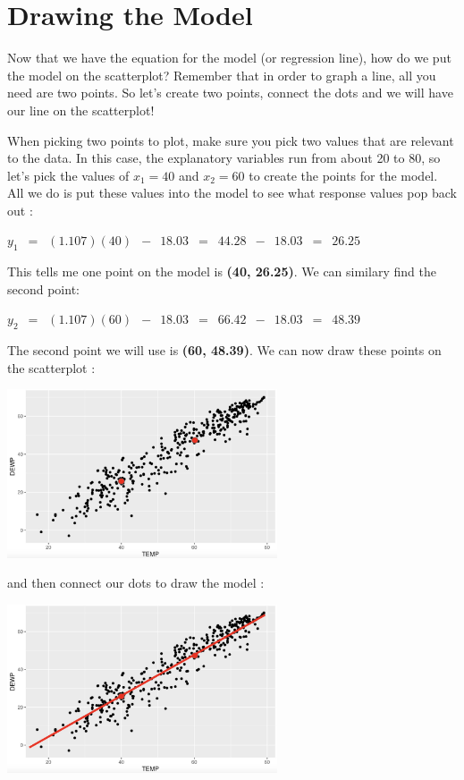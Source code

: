 \documentclass[
  letterpaper,
  DIV=11,
  numbers=noendperiod]{scrreprt}
\begin{document}
\section*{Drawing the Model}\label{drawing-the-model}


Now that we have the equation for the model (or regression line), how do
we put the model on the scatterplot? Remember that in order to graph a
line, all you need are two points. So let's create two points, connect
the dots and we will have our line on the scatterplot!

When picking two points to plot, make sure you pick two values that are
relevant to the data. In this case, the explanatory variables run from
about 20 to 80, so let's pick the values of \(x_1 = 40\) and
\(x_2 = 60\) to create the points for the model. All we do is put these
values into the model to see what response values pop back out :

\(\displaystyle{y_1 \,\,\, = \,\,\,(1.107)(40)\,\,\, -\,\,\, 18.03\,\,\,
= \,\,\, 44.28 \,\,\,-\,\,\,18.03\,\,\,=\,\,\,26.25}\)

This tells me one point on the model is \textbf{(40, 26.25)}. We can
similary find the second point:

\(\displaystyle{y_2 \,\,\, = \,\,\,(1.107)(60)\,\,\, -\,\,\, 18.03\,\,\,
= \,\,\, 66.42 \,\,\,-\,\,\,18.03\,\,\,=\,\,\,48.39}\)

The second point we will use is \textbf{(60, 48.39)}. We can now draw
these points on the scatterplot :

\includegraphics[width=0.6\textwidth,height=\textheight]{./images/LMR_6.jpg}

and then connect our dots to draw the model :

\includegraphics[width=0.6\textwidth,height=\textheight]{./images/LMR_7.jpg}
\end{document}
